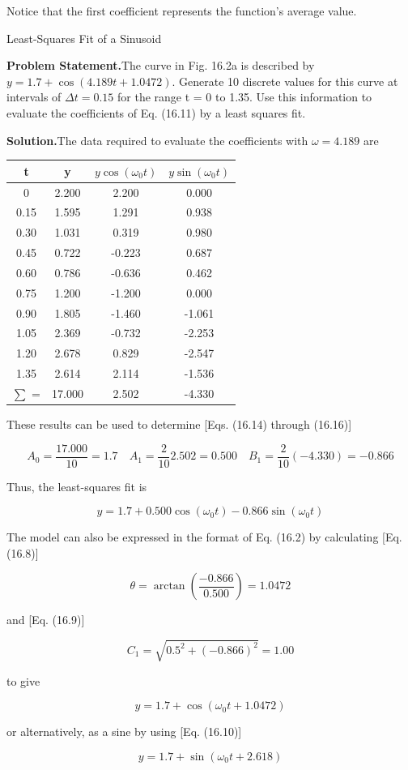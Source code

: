 \documentclass[../main.tex]{subfiles}
\begin{document}
\noindent Notice that the first coefficient represents the function's average value.

\begin{example} Least-Squares Fit of a Sinusoid

    \noindent\textbf{Problem Statement.}\quad The curve in Fig. 16.2a is described by $y = 1.7 + \cos(4.189t + 1.0472)$. Generate 10 discrete values for this curve at intervals of $\Delta t = 0.15$ for the range
	t = 0 to 1.35. Use this information to evaluate the coefficients of Eq. (16.11) by a least squares fit.

    \noindent\textbf{Solution.}\quad  The data required to evaluate the coefficients with $\omega = 4.189$ are

	\noindent
	\begin{tabular}{c c c c}
		\textbf{t} & \textbf{y} & \textbf{$y \cos(\omega_0 t)$} & \textbf{$y \sin(\omega_0 t)$} \\
		\hline
		0 & 2.200 & 2.200 & 0.000 \\
		0.15 & 1.595 & 1.291 & 0.938 \\
		0.30 & 1.031 & 0.319 & 0.980 \\
		0.45 & 0.722 & -0.223 & 0.687 \\
		0.60 & 0.786 & -0.636 & 0.462 \\
		0.75 & 1.200 & -1.200 & 0.000 \\
		0.90 & 1.805 & -1.460 & -1.061 \\
		1.05 & 2.369 & -0.732 & -2.253 \\
		1.20 & 2.678 & 0.829 & -2.547 \\
		1.35 & 2.614 & 2.114 & -1.536 \\
		\hline
		$\sum$ = & 17.000 & 2.502 & -4.330
	\end{tabular}

	\noindent These results can be used to determine [Eqs. (16.14) through (16.16)]

	$$
		A_0 = \frac{17.000}{10} = 1.7	\quad A_1 = \frac{2}{10} 2.502 = 0.500 \quad B_1 = \frac{2}{10} (-4.330) = -0.866
	$$

	\noindent Thus, the least-squares fit is

	$$
		y = 1.7 + 0.500 \cos(\omega_0 t) - 0.866 \sin(\omega_0 t)
	$$

	\noindent The model can also be expressed in the format of Eq. (16.2) by calculating [Eq. (16.8)]

	$$
		\theta = \arctan (\frac{-0.866}{0.500}) = 1.0472
	$$

	\noindent and [Eq. (16.9)]

	$$
		C_1 = \sqrt{0.5^2 + (-0.866)^2} = 1.00
	$$

	\noindent to give 

	$$
		y = 1.7 + \cos(\omega_0 t + 1.0472)
	$$

	\noindent or alternatively, as a sine by using [Eq. (16.10)]

	$$
		y = 1.7 + \sin (\omega_0 t + 2.618)
	$$
\end{example}
\end{document}
